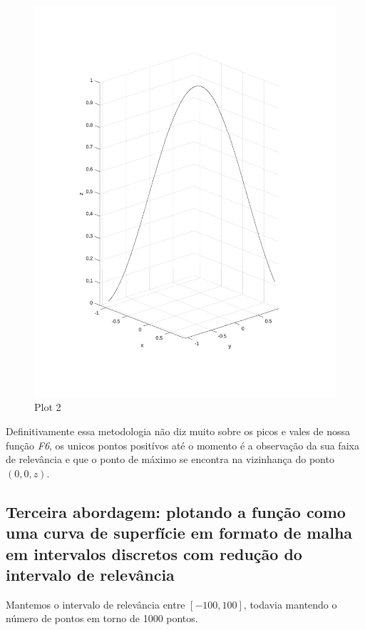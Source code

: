 \documentclass{article}
\begin{document}
\newpage
\begin{figure}[h!]
\centering
\includegraphics[scale=.5]{images/myplot2.pdf}
\caption{Plot 2}
\label{fig:plot2_f6}
\end{figure}

\begin{flushleft}
	Definitivamente essa metodologia não diz muito sobre os picos e
	vales de nossa função \emph{F6}, os unicos pontos positívos até
	o momento é a observação da sua faixa de relevância e que o
	ponto de máximo se encontra na vizinhança do ponto $(0,0,z)$.
\end{flushleft}

\newpage
\subsection*{Terceira abordagem: plotando a função como uma curva de superfície em formato de malha em intervalos discretos com redução do intervalo de relevância}

Mantemos o intervalo de relevância entre $[-100,100]$, todavia mantendo o número de pontos em torno de 1000 pontos.
\end{document}
